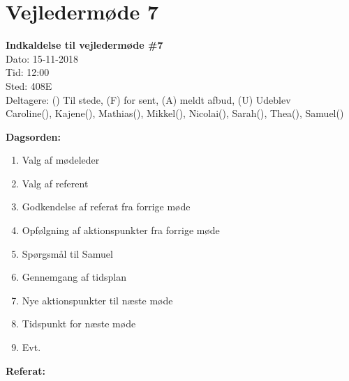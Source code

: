 \section{Vejledermøde 7}

\vspace{0.5 cm}
\textbf{Indkaldelse til vejledermøde \#7} \\

Dato: 15-11-2018 \\
Tid: 12:00 \\
Sted: 408E \\
Deltagere: () Til stede, (F) for sent, (A) meldt afbud, (U) Udeblev \\
Caroline(), Kajene(), Mathias(), Mikkel(), Nicolai(), Sarah(), Thea(), Samuel() 

\vspace{0.1 cm}
\textbf{Dagsorden:}

\begin{enumerate}
	\item Valg af mødeleder
	\item Valg af referent
	\item Godkendelse af referat fra forrige møde
	\item Opfølgning af aktionspunkter fra forrige møde
	\item Spørgsmål til Samuel
	\item Gennemgang af tidsplan
	\item Nye aktionspunkter til næste møde
	\item Tidspunkt for næste møde
	\item Evt.
\end{enumerate}

\textbf{Referat:}

